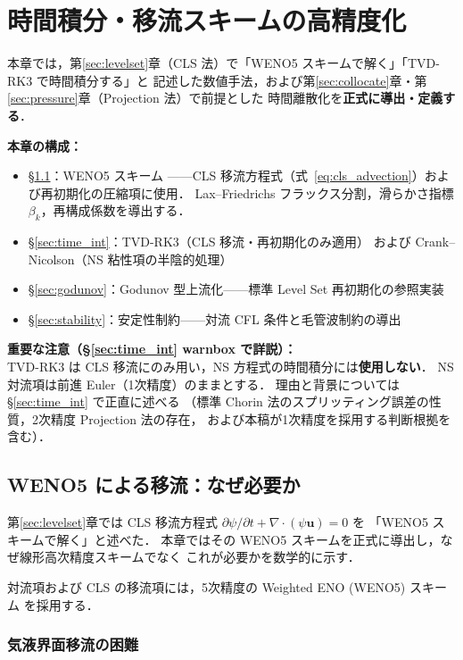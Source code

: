 \section{時間積分・移流スキームの高精度化}
\label{sec:time}

本章では，第\ref{sec:levelset}章（CLS 法）で「WENO5 スキームで解く」「TVD-RK3 で時間積分する」と
記述した数値手法，および第\ref{sec:collocate}章・第\ref{sec:pressure}章（Projection 法）で前提とした
時間離散化を\textbf{正式に導出・定義する}．

\medskip
\textbf{本章の構成：}
\begin{itemize}
  \item §\ref{sec:weno5}：WENO5 スキーム
        ——CLS 移流方程式（式~\eqref{eq:cls_advection}）および再初期化の圧縮項に使用．
        Lax--Friedrichs フラックス分割，滑らかさ指標 $\beta_k$，再構成係数を導出する．
  \item §\ref{sec:time_int}：TVD-RK3（CLS 移流・再初期化のみ適用）
        および Crank--Nicolson（NS 粘性項の半陰的処理）
  \item §\ref{sec:godunov}：Godunov 型上流化——標準 Level Set 再初期化の参照実装
  \item §\ref{sec:stability}：安定性制約——対流 CFL 条件と毛管波制約の導出
\end{itemize}

\medskip
\textbf{重要な注意（§\ref{sec:time_int} warnbox で詳説）：}\\
TVD-RK3 は CLS 移流にのみ用い，NS 方程式の時間積分には\textbf{使用しない}．
NS 対流項は前進 Euler（1次精度）のままとする．
理由と背景については §\ref{sec:time_int} で正直に述べる
（標準 Chorin 法のスプリッティング誤差の性質，2次精度 Projection 法の存在，
および本稿が1次精度を採用する判断根拠を含む）．

\subsection{WENO5 による移流：なぜ必要か}
\label{sec:weno5}

第\ref{sec:levelset}章では CLS 移流方程式 $\partial\psi/\partial t + \nabla\cdot(\psi\bm{u}) = 0$ を
「WENO5 スキームで解く」と述べた．
本章ではその WENO5 スキームを正式に導出し，なぜ線形高次精度スキームでなく
これが必要かを数学的に示す．

対流項および CLS の移流項には，5次精度の Weighted ENO (WENO5) スキーム \cite{JiangShu1996} を採用する．

\subsubsection{気液界面移流の困難}


